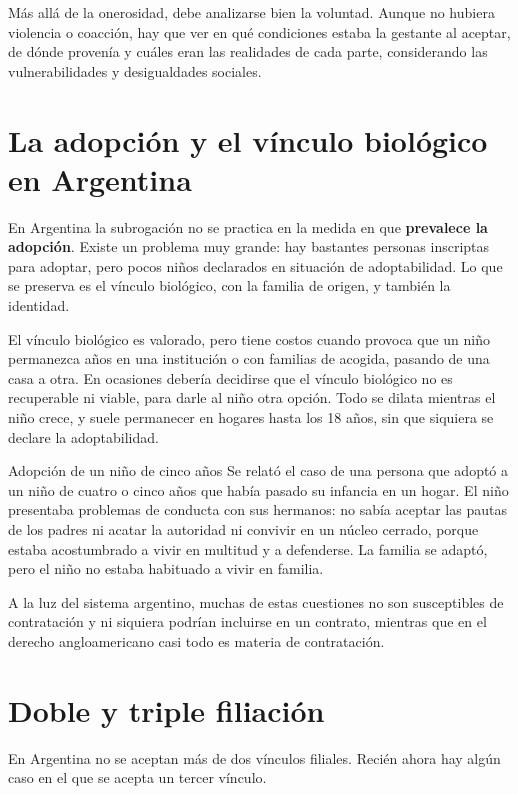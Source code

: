 \documentclass[12pt,oneside]{book}
\begin{document}
Más allá de la onerosidad, debe analizarse bien la voluntad. Aunque no hubiera violencia o coacción, hay que ver en qué condiciones estaba la gestante al aceptar, de dónde provenía y cuáles eran las realidades de cada parte, considerando las vulnerabilidades y desigualdades sociales.

\section{La adopción y el vínculo biológico en Argentina}

En Argentina la subrogación no se practica en la medida en que \textbf{prevalece la adopción}. Existe un problema muy grande: hay bastantes personas inscriptas para adoptar, pero pocos niños declarados en situación de adoptabilidad. Lo que se preserva es el vínculo biológico, con la familia de origen, y también la identidad.

El vínculo biológico es valorado, pero tiene costos cuando provoca que un niño permanezca años en una institución o con familias de acogida, pasando de una casa a otra. En ocasiones debería decidirse que el vínculo biológico no es recuperable ni viable, para darle al niño otra opción. Todo se dilata mientras el niño crece, y suele permanecer en hogares hasta los 18 años, sin que siquiera se declare la adoptabilidad.

\begin{example}{Adopción de un niño de cinco años}
Se relató el caso de una persona que adoptó a un niño de cuatro o cinco años que había pasado su infancia en un hogar. El niño presentaba problemas de conducta con sus hermanos: no sabía aceptar las pautas de los padres ni acatar la autoridad ni convivir en un núcleo cerrado, porque estaba acostumbrado a vivir en multitud y a defenderse. La familia se adaptó, pero el niño no estaba habituado a vivir en familia.
\end{example}

A la luz del sistema argentino, muchas de estas cuestiones no son susceptibles de contratación y ni siquiera podrían incluirse en un contrato, mientras que en el derecho angloamericano casi todo es materia de contratación.

\section{Doble y triple filiación}

En Argentina no se aceptan más de dos vínculos filiales. Recién ahora hay algún caso en el que se acepta un tercer vínculo.
\end{document}
